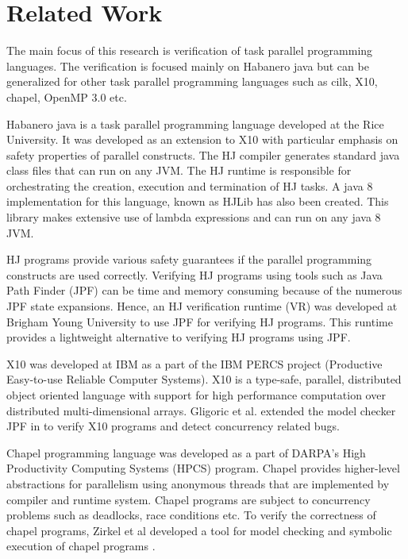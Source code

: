 \section{Related Work}

The main focus of this research is verification of task parallel programming languages. The verification is focused mainly on Habanero java but can be generalized for other task parallel programming languages such as cilk, X10, chapel, OpenMP 3.0 etc.

Habanero java \cite{cave2011habanero} is a task parallel programming language developed at the Rice University. It was developed as an extension to X10 with particular emphasis on safety properties of parallel constructs. The HJ compiler generates standard java class files that can run on any JVM. The HJ runtime is responsible for orchestrating the creation, execution and termination of HJ tasks. A java 8 implementation for this language, known as HJLib \cite{imam2014habanero} has also been created. This library makes extensive use of lambda expressions and can run on any java 8 JVM.

HJ programs provide various safety guarantees if the parallel programming constructs are used correctly. Verifying HJ programs using tools such as Java Path Finder (JPF) can be time and memory consuming because of the numerous JPF state expansions. Hence, an HJ verification runtime (VR) \cite{anderson2014jpf} was developed at Brigham Young University to use JPF for verifying HJ programs. This runtime provides a lightweight alternative to verifying HJ programs using JPF.

X10 \cite{charles2005x10} was developed at IBM as a part of the IBM PERCS project (Productive Easy-to-use Reliable Computer Systems). X10 is a type-safe, parallel, distributed object oriented language with support for high performance computation over distributed multi-dimensional arrays. Gligoric et al. extended the model checker JPF in \cite{gligoric2012x10x} to verify X10 programs and detect concurrency related bugs.

Chapel programming language \cite{chamberlain2007parallel} was developed as a part of DARPA's High Productivity Computing Systems (HPCS) program. Chapel provides higher-level abstractions for parallelism using anonymous threads that are implemented by compiler and runtime system. Chapel programs are subject to concurrency problems such as deadlocks, race conditions etc. To verify the correctness of chapel programs, Zirkel et al developed a tool for model checking and symbolic execution of chapel programs \cite{zirkel2013automated}.

